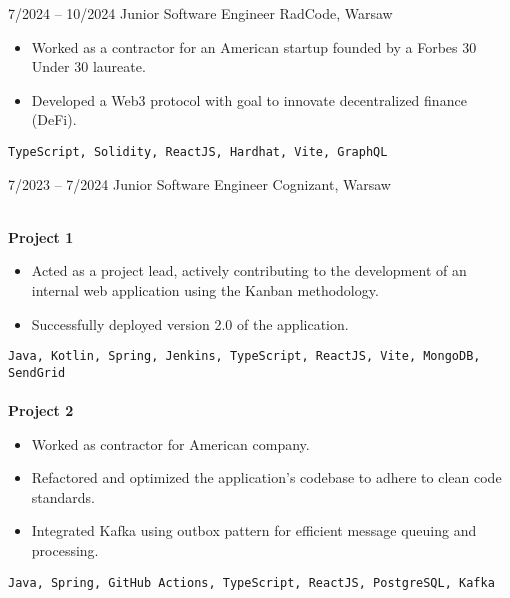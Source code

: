 \documentclass[8pt]{developercv} %
\begin{document}
\vspace{-15pt}
\begin{entrylist}
    \entry
        {7/2024 -- 10/2024}
		{Junior Software Engineer}
		{RadCode, Warsaw}
		{
        \begin{itemize}[noitemsep,topsep=0pt,parsep=0pt,partopsep=0pt, leftmargin=-1pt]
            \item Worked as a contractor for an American startup founded by a Forbes 30 Under 30 laureate.
            \item Developed a Web3 protocol with goal to innovate decentralized finance (DeFi).
        \end{itemize}
        \vspace{2mm}
        \texttt{TypeScript, Solidity, ReactJS, Hardhat, Vite, GraphQL}
        }
	\entry
        {7/2023 -- 7/2024}
		{Junior Software Engineer}
		{Cognizant, Warsaw}
		{\\
        \textbf{\small Project 1}\\
        \vspace{-10pt}
        \begin{itemize}[noitemsep,topsep=0pt,parsep=0pt,partopsep=0pt, leftmargin=-1pt]
            \item Acted as a project lead, actively contributing to the development of an internal web application using the Kanban methodology.
            \item Successfully deployed version 2.0 of the application.
        \end{itemize}
        \vspace{2mm}
        \texttt{Java, Kotlin, Spring, Jenkins, TypeScript, ReactJS, Vite, MongoDB, SendGrid}
        \\\\
        \textbf{\small Project 2}\\
        \vspace{-10pt}
        \begin{itemize}[noitemsep,topsep=0pt,parsep=0pt,partopsep=0pt, leftmargin=-1pt]
            \item Worked as contractor for American company.
            \item Refactored and optimized the application's codebase to adhere to clean code standards.
            \item Integrated Kafka using outbox pattern for efficient message queuing and processing.
        \end{itemize}
        \vspace{2mm}
        \texttt{Java, Spring, GitHub Actions, TypeScript, ReactJS, PostgreSQL, Kafka}}

\end{entrylist}
\end{document}
